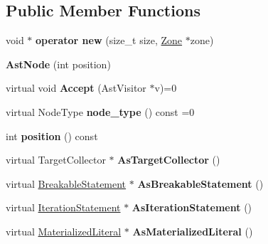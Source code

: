 \subsection*{Public Member Functions}
\begin{DoxyCompactItemize}
\item 
\hypertarget{classv8_1_1internal_1_1_ast_node_a3b42cf9e8f0c9685573ab0f445d30856}{}void $\ast$ {\bfseries operator new} (size\+\_\+t size, \hyperlink{classv8_1_1internal_1_1_zone}{Zone} $\ast$zone)\label{classv8_1_1internal_1_1_ast_node_a3b42cf9e8f0c9685573ab0f445d30856}

\item 
\hypertarget{classv8_1_1internal_1_1_ast_node_a68e77a52aeaab6205eed81558e39b51b}{}{\bfseries Ast\+Node} (int position)\label{classv8_1_1internal_1_1_ast_node_a68e77a52aeaab6205eed81558e39b51b}

\item 
\hypertarget{classv8_1_1internal_1_1_ast_node_a997460b9c5bb89418e5e2a3e760598bd}{}virtual void {\bfseries Accept} (Ast\+Visitor $\ast$v)=0\label{classv8_1_1internal_1_1_ast_node_a997460b9c5bb89418e5e2a3e760598bd}

\item 
\hypertarget{classv8_1_1internal_1_1_ast_node_a324bb4fe66bf389e5aa7c4941dd66a14}{}virtual Node\+Type {\bfseries node\+\_\+type} () const =0\label{classv8_1_1internal_1_1_ast_node_a324bb4fe66bf389e5aa7c4941dd66a14}

\item 
\hypertarget{classv8_1_1internal_1_1_ast_node_ac0e91623e58fe05cab42baa305244763}{}int {\bfseries position} () const \label{classv8_1_1internal_1_1_ast_node_ac0e91623e58fe05cab42baa305244763}

\item 
\hypertarget{classv8_1_1internal_1_1_ast_node_a48629ff0b786509f881e2ce51de4cffe}{}virtual Target\+Collector $\ast$ {\bfseries As\+Target\+Collector} ()\label{classv8_1_1internal_1_1_ast_node_a48629ff0b786509f881e2ce51de4cffe}

\item 
\hypertarget{classv8_1_1internal_1_1_ast_node_abe218efc9b25b70a3b41dae3c770be66}{}virtual \hyperlink{classv8_1_1internal_1_1_breakable_statement}{Breakable\+Statement} $\ast$ {\bfseries As\+Breakable\+Statement} ()\label{classv8_1_1internal_1_1_ast_node_abe218efc9b25b70a3b41dae3c770be66}

\item 
\hypertarget{classv8_1_1internal_1_1_ast_node_aaa1521749945a0854c729246a1661132}{}virtual \hyperlink{classv8_1_1internal_1_1_iteration_statement}{Iteration\+Statement} $\ast$ {\bfseries As\+Iteration\+Statement} ()\label{classv8_1_1internal_1_1_ast_node_aaa1521749945a0854c729246a1661132}

\item 
\hypertarget{classv8_1_1internal_1_1_ast_node_a7025f31bbb7c7df1d753d06d2efd31fa}{}virtual \hyperlink{classv8_1_1internal_1_1_materialized_literal}{Materialized\+Literal} $\ast$ {\bfseries As\+Materialized\+Literal} ()\label{classv8_1_1internal_1_1_ast_node_a7025f31bbb7c7df1d753d06d2efd31fa}

\end{DoxyCompactItemize}
